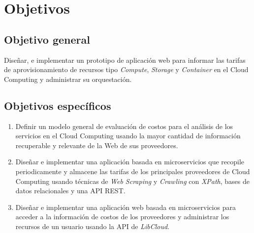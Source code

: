 \chapter{Objetivos} %

\label{ch:objetivos} %




\section{Objetivo general}
Diseñar, e implementar un prototipo de aplicación web para informar las tarifas de aprovisionamiento de recursos tipo \textit{Compute}, \textit{Storage} y \textit{Container} en el Cloud Computing y administrar su orquestación.\bigskip

\section{Objetivos específicos}
\begin{enumerate}
    \item Definir un modelo general de evaluación de costos para el análisis de los servicios en el Cloud Computing usando la mayor cantidad de información recuperable y relevante de la Web de sus proveedores.
    
    \item Diseñar e implementar una aplicación basada en microservicios que recopile periodicamente y almacene las tarifas de los principales proveedores de Cloud Computing usando técnicas de \textit{Web Scraping} y \textit{Crawling} con \textit{XPath}, bases de datos relacionales y una \acs{API REST}.
    
    \item Diseñar e implementar una aplicación web basada en microservicios para acceder a la información de costos de los proveedores y administrar los recursos de un usuario usando la \acs{API} de \textit{LibCloud}.
    
\end{enumerate}